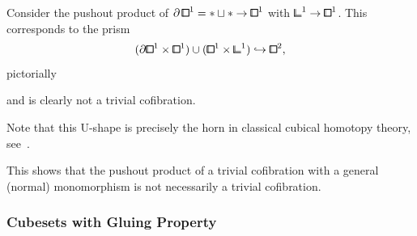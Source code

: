 \begin{example}
	Consider the pushout product of $\partial \bbox^1=\ast\sqcup\ast\to\bbox^1$ with $\bbcor^1\to \bbox^1$.
	This corresponds to the prism
	\[(\partial {\bbox}^1\times {\bbox}^1)\cup ({\bbox}^1\times {\bbcor}^1)\hookrightarrow {\bbox}^2,\]
	pictorially
	\begin{center}
	\end{center}
	and is clearly not a trivial cofibration.
\end{example}

\begin{remark}
	Note that this U-shape is precisely the horn in classical cubical homotopy theory,
	see~\cite[Definition 10.3.2]{Brown2011}.
\end{remark}

This shows that the pushout product of a trivial cofibration with a general (normal) monomorphism is not necessarily a trivial cofibration.



\subsubsection{Cubesets with Gluing Property}

